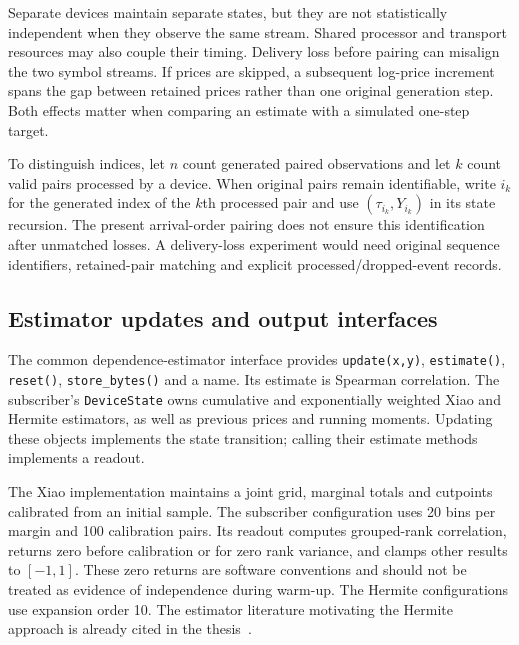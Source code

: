 Separate devices maintain separate states, but they are not statistically independent when they observe the same stream. Shared processor and transport resources may also couple their timing. Delivery loss before pairing can misalign the two symbol streams. If prices are skipped, a subsequent log-price increment spans the gap between retained prices rather than one original generation step. Both effects matter when comparing an estimate with a simulated one-step target.

To distinguish indices, let $n$ count generated paired observations and let $k$ count valid pairs processed by a device. When original pairs remain identifiable, write $i_k$ for the generated index of the $k$th processed pair and use $(\tau_{i_k},Y_{i_k})$ in its state recursion. The present arrival-order pairing does not ensure this identification after unmatched losses. A delivery-loss experiment would need original sequence identifiers, retained-pair matching and explicit processed/dropped-event records.

\subsection{Estimator updates and output interfaces}
The common dependence-estimator interface provides \texttt{update(x,y)}, \texttt{estimate()}, \texttt{reset()}, \texttt{store\_bytes()} and a name. Its estimate is Spearman correlation. The subscriber's \texttt{DeviceState} owns cumulative and exponentially weighted Xiao and Hermite estimators, as well as previous prices and running moments. Updating these objects implements the state transition; calling their estimate methods implements a readout.

The Xiao implementation maintains a joint grid, marginal totals and cutpoints calibrated from an initial sample. The subscriber configuration uses 20 bins per margin and 100 calibration pairs. Its readout computes grouped-rank correlation, returns zero before calibration or for zero rank variance, and clamps other results to $[-1,1]$. These zero returns are software conventions and should not be treated as evidence of independence during warm-up. The Hermite configurations use expansion order 10. The estimator literature motivating the Hermite approach is already cited in the thesis~\cite{stephanou_sequential_2021}.

